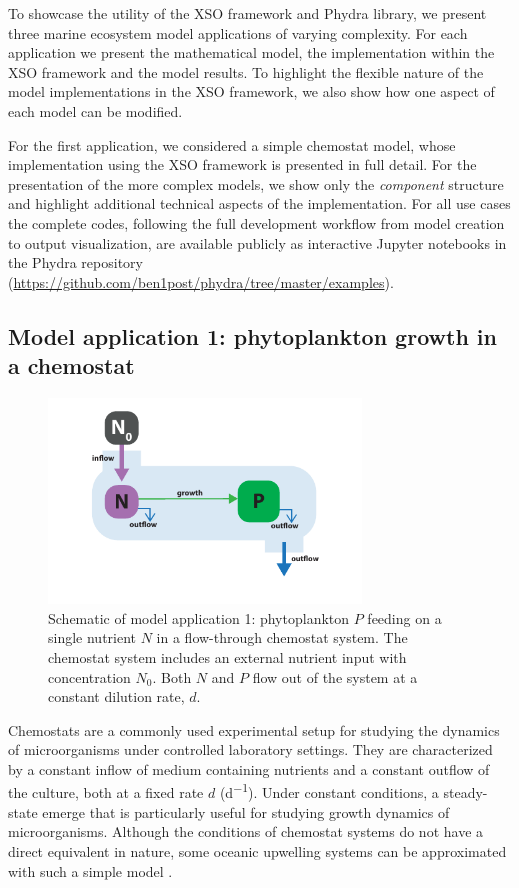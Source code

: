 \documentclass[journal abbreviation, manuscript]{copernicus}
\begin{document}
To showcase the utility of the XSO framework and Phydra library, we present three marine ecosystem model applications of varying complexity. For each application we present the mathematical model, the implementation within the XSO framework and the model results. To highlight the flexible nature of the model implementations in the XSO framework, we also show how one aspect of each model can be modified.

For the first application, we considered a simple chemostat model, whose implementation using the XSO framework is presented in full detail. For the presentation of the more complex models, we show only the \textit{component} structure and highlight additional technical aspects of the implementation. For all use cases the complete codes, following the full development workflow from model creation to output visualization, are available publicly as interactive Jupyter notebooks in the Phydra repository (\url{https://github.com/ben1post/phydra/tree/master/examples}).

\subsection{Model application 1: phytoplankton growth in a chemostat}
\begin{figure}[t]
\includegraphics[width=8.3cm]{Figures/firstdraft_schematics/01_schematics_Chemostat.pdf}
\caption{Schematic of model application 1: phytoplankton $P$ feeding on a single nutrient $N$ in a flow-through chemostat system. The chemostat system includes an external nutrient input with concentration $N_0$. Both $N$ and $P$ flow out of the system at a constant dilution rate, $d$.}
\label{Figure:ModelSchematics_1}
\end{figure}

Chemostats are a commonly used experimental setup for studying the dynamics of microorganisms under controlled laboratory settings. They are characterized by a constant inflow of medium containing nutrients and a constant outflow of the culture, both at a fixed rate $d$ (\unit{d^{-1}}). Under constant conditions, a steady-state emerge that is particularly useful for studying growth dynamics of microorganisms. Although the conditions of chemostat systems do not have a direct equivalent in nature, some oceanic upwelling systems can be approximated with such a simple model \citep{Haefner2005ModelingApplications}.
\end{document}
